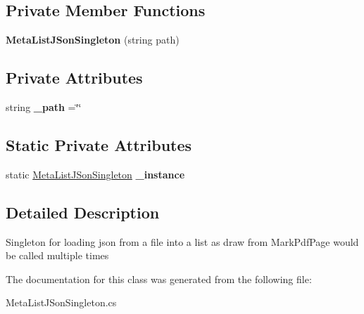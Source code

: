 \subsection*{Private Member Functions}
\begin{DoxyCompactItemize}
\item 
\mbox{\label{class_ramboell_1_1i_o_s_1_1_meta_list_j_son_singleton_a4c53cce0428da8e4f5be5950e884a8ad}} 
{\bfseries Meta\+List\+J\+Son\+Singleton} (string path)
\end{DoxyCompactItemize}
\subsection*{Private Attributes}
\begin{DoxyCompactItemize}
\item 
\mbox{\label{class_ramboell_1_1i_o_s_1_1_meta_list_j_son_singleton_a4d6f60f45234b616c6588019567b837a}} 
string {\bfseries \+\_\+path} =\char`\"{}\char`\"{}
\end{DoxyCompactItemize}
\subsection*{Static Private Attributes}
\begin{DoxyCompactItemize}
\item 
\mbox{\label{class_ramboell_1_1i_o_s_1_1_meta_list_j_son_singleton_aa5187f1cc93f8405c270e7b19844e5fe}} 
static \hyperlink{class_ramboell_1_1i_o_s_1_1_meta_list_j_son_singleton}{Meta\+List\+J\+Son\+Singleton} {\bfseries \+\_\+instance}
\end{DoxyCompactItemize}


\subsection{Detailed Description}
Singleton for loading json from a file into a list as draw from Mark\+Pdf\+Page would be called multiple times 



The documentation for this class was generated from the following file\+:\begin{DoxyCompactItemize}
\item 
Meta\+List\+J\+Son\+Singleton.\+cs\end{DoxyCompactItemize}
